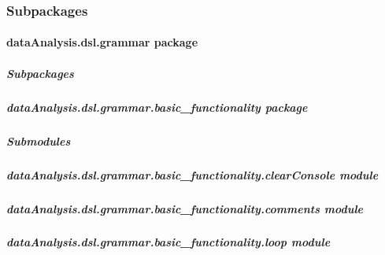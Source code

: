 \documentclass[letterpaper,10pt,english]{sphinxmanual}
\begin{document}
\subsubsection{Subpackages}
\label{dataAnalysis.dsl:subpackages}

\paragraph{dataAnalysis.dsl.grammar package}
\label{dataAnalysis.dsl.grammar:dataanalysis-dsl-grammar-package}\label{dataAnalysis.dsl.grammar::doc}

\subparagraph{Subpackages}
\label{dataAnalysis.dsl.grammar:subpackages}

\subparagraph{dataAnalysis.dsl.grammar.basic\_functionality package}
\label{dataAnalysis.dsl.grammar.basic_functionality:dataanalysis-dsl-grammar-basic-functionality-package}\label{dataAnalysis.dsl.grammar.basic_functionality::doc}

\subparagraph{Submodules}
\label{dataAnalysis.dsl.grammar.basic_functionality:submodules}

\subparagraph{dataAnalysis.dsl.grammar.basic\_functionality.clearConsole module}
\label{dataAnalysis.dsl.grammar.basic_functionality:dataanalysis-dsl-grammar-basic-functionality-clearconsole-module}\label{dataAnalysis.dsl.grammar.basic_functionality:module-dataAnalysis.dsl.grammar.basic_functionality.clearConsole}

\begin{fulllineitems}
\label{dataAnalysis.dsl.grammar.basic_functionality:dataAnalysis.dsl.grammar.basic_functionality.clearConsole.clearConsole}
\end{fulllineitems}



\subparagraph{dataAnalysis.dsl.grammar.basic\_functionality.comments module}
\label{dataAnalysis.dsl.grammar.basic_functionality:module-dataAnalysis.dsl.grammar.basic_functionality.comments}\label{dataAnalysis.dsl.grammar.basic_functionality:dataanalysis-dsl-grammar-basic-functionality-comments-module}

\subparagraph{dataAnalysis.dsl.grammar.basic\_functionality.loop module}
\label{dataAnalysis.dsl.grammar.basic_functionality:dataanalysis-dsl-grammar-basic-functionality-loop-module}
\end{document}
